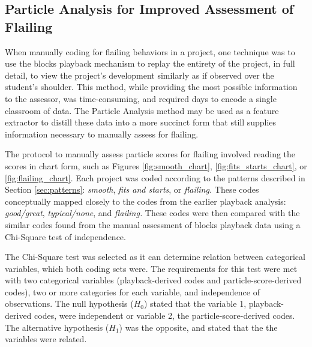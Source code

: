 \subsection{Particle Analysis for Improved Assessment of Flailing}
\label{sec:validation-particle}
When manually coding for flailing behaviors in a project, one technique was to use the blocks playback mechanism to replay the entirety of the project, in full detail, to view the project's development similarly as if observed over the student's shoulder. This method, while providing the most possible information to the assessor, was time-consuming, and required days to encode a single classroom of data. The Particle Analysis method may be used as a feature extractor to distill these data into a more succinct form that still supplies information necessary to manually assess for flailing. 

The protocol to manually assess particle scores for flailing involved reading the scores in chart form, such as Figures \ref{fig:smooth_chart}, \ref{fig:fits_starts_chart}, or \ref{fig:flailing_chart}. Each project was coded according to the patterns described in Section \ref{sec:patterns}: \emph{smooth}, \emph{fits and starts}, or \emph{flailing.} These codes conceptually mapped closely to the codes from the earlier playback analysis: \emph{good/great}, \emph{typical/none}, and \emph{flailing.}
These codes were then compared with the similar codes found from the manual assessment of blocks playback data using a Chi-Square test of independence.

The Chi-Square test was selected as it can determine relation between categorical variables, which both coding sets were. The requirements for this test were met with two categorical variables (playback-derived codes and particle-score-derived codes), two or more categories for each variable, and independence of observations. The null hypothesis ($H_0$) stated that the variable 1, playback-derived codes, were independent or variable 2, the particle-score-derived codes. The alternative hypothesis ($H_1$) was the opposite, and stated that the the variables were related.

